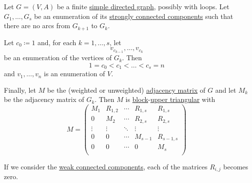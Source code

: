 \begin{proposition}\label{thm:adjacency_matrix_components}
  Let \( G = (V, A) \) be a finite \hyperref[def:directed_graph]{simple directed graph}, possibly with loops. Let \( G_1, \ldots, G_s \) be an enumeration of its \hyperref[def:graph_connectedness/strong]{strongly connected components} such that there are no arcs from \( G_{k+1} \) to \( G_k \).

  Let \( c_0 \coloneqq 1 \) and, for each \( k = 1, \ldots, s \), let
  \begin{equation*}
    v_{c_{k-1}}, \ldots, v_{c_k}
  \end{equation*}
  be an enumeration of the vertices of \( G_k \). Then
  \begin{equation*}
    1 = c_0 < c_1 < \ldots < c_s = n
  \end{equation*}
  and \( v_1, \ldots, v_n \) is an enumeration of \( V \).

  Finally, let \( M \) be the (weighted or unweighted) \hyperref[def:graph_adjacency_matrix]{adjacency matrix} of \( G \) and let \( M_k \) be the adjacency matrix of \( G_k \). Then \( M \) is \hyperref[def:block_matrix]{block}-\hyperref[def:triangular_matrix]{upper triangular} with
  \begin{equation}\label{eq:thm:adjacency_matrix_components}
    M = \begin{pmatrix}
      M_1    & R_{1,2} & \cdots & R_{1,s} & R_{1,s}   \\
      0      & M_2     & \cdots & R_{2,s} & R_{2,s}   \\
      \vdots & \vdots  & \ddots & \vdots  & \vdots    \\
      0      & 0       & \cdots & M_{s-1} & R_{s-1,s} \\
      0      & 0       & \cdots & 0       & M_s       \\
    \end{pmatrix}
  \end{equation}

  If we consider the \hyperref[def:graph_connectedness/weak]{weak connected components}, each of the matrices \( R_{i,j} \) becomes zero.
\end{proposition}
